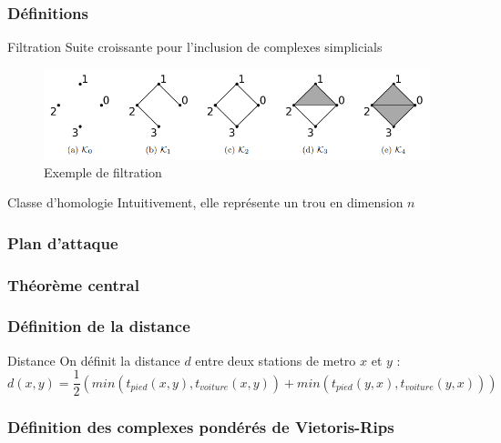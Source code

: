 \documentclass{beamer}
\begin{document}
\begin{frame}
    \frametitle{Définitions}
    \begin{block}{Filtration}
        Suite croissante pour l'inclusion de complexes simplicials
    \end{block}

    \begin{figure}
        \includegraphics[width=\textwidth]{filtration}
        \centering
        \caption{Exemple de filtration}
    \end{figure}

    \begin{block}{Classe d'homologie}
        Intuitivement, elle représente un trou en dimension $n$

    \end{block}
\end{frame}

\begin{frame}
    \frametitle{Plan d'attaque}

\end{frame}

\begin{frame}
    \frametitle{Théorème central}
\end{frame}

\begin{frame}
    \frametitle{Définition de la distance}
    
    \begin{block}{Distance}
        On définit la distance $d$ entre deux stations de metro $x$ et $y$ : 
        $$ d(x,y) = \frac{1}{2}(min(t_{pied}(x,y), t_{voiture}(x,y)) + min(t_{pied}(y,x), t_{voiture}(y,x)))$$
    \end{block}
\end{frame}

\begin{frame}
    \frametitle{Définition des complexes pondérés de Vietoris-Rips}
    
    
\end{frame}
\end{document}
